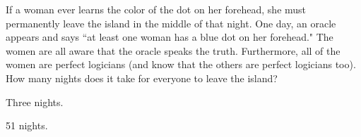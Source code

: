 \documentclass[twoside]{article}
\newcommand{\solution}[1]{{\color{red}#1}}
\begin{document}
\begin{enumerate}
\begin{enumerate}
\end{enumerate}

 \newline\newline If a woman ever learns the color of the dot on her forehead, she must permanently leave the island in the middle of that night. \newline\newline One day, an oracle appears and says ``at least one woman has a blue dot on her forehead." The women are all aware that the oracle speaks the truth. Furthermore, all of the women are perfect logicians (and know that the others are perfect logicians too). How many nights does it take for everyone to leave the island?

\solution{Three nights.}
\newline


\solution{51 nights.}

\end{enumerate}
\end{document}
